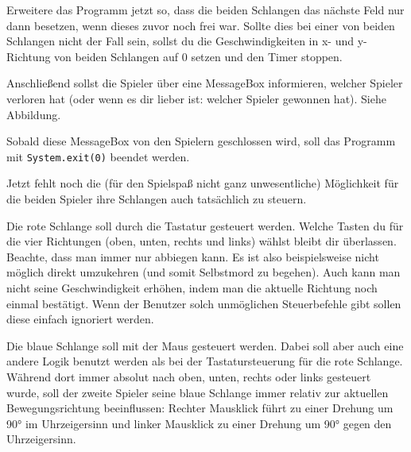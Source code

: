 \begin{compactenum}[a)]
Erweitere das Programm jetzt so, dass die beiden Schlangen das nächste Feld nur
dann besetzen, wenn dieses zuvor noch frei war. Sollte dies bei einer von
beiden Schlangen nicht der Fall sein, sollst du die Geschwindigkeiten in x- und
y-Richtung von beiden Schlangen auf 0 setzen und den Timer stoppen.

Anschließend sollst die Spieler über eine MessageBox informieren, welcher
Spieler verloren hat (oder wenn es dir lieber ist: welcher Spieler gewonnen
hat). Siehe Abbildung.

Sobald diese MessageBox von den Spielern geschlossen wird, soll das Programm
mit \lstinline|System.exit(0)| beendet werden.

\item Jetzt fehlt noch die (für den Spielspaß nicht ganz unwesentliche)
Möglichkeit für die beiden Spieler ihre Schlangen auch tatsächlich zu steuern.

Die rote Schlange soll durch die Tastatur gesteuert werden. Welche Tasten du
für die vier Richtungen (oben, unten, rechts und links)  wählst bleibt dir
überlassen. Beachte, dass man immer nur abbiegen kann. Es ist also
beispielsweise nicht möglich direkt umzukehren (und somit Selbstmord zu
begehen). Auch kann man nicht seine Geschwindigkeit erhöhen, indem man die
aktuelle Richtung noch einmal bestätigt. Wenn der Benutzer solch unmöglichen
Steuerbefehle gibt sollen diese einfach ignoriert werden.

\item Die blaue Schlange soll mit der Maus gesteuert werden. Dabei soll aber
auch eine andere Logik benutzt werden als bei der Tastatursteuerung für die
rote Schlange. Während dort immer absolut nach oben, unten, rechts oder links
gesteuert wurde, soll der zweite Spieler seine blaue Schlange immer relativ zur
aktuellen Bewegungsrichtung beeinflussen: Rechter Mausklick führt zu einer
Drehung um 90° im Uhrzeigersinn und linker Mausklick zu einer Drehung um 90°
gegen den Uhrzeigersinn.
\end{compactenum}